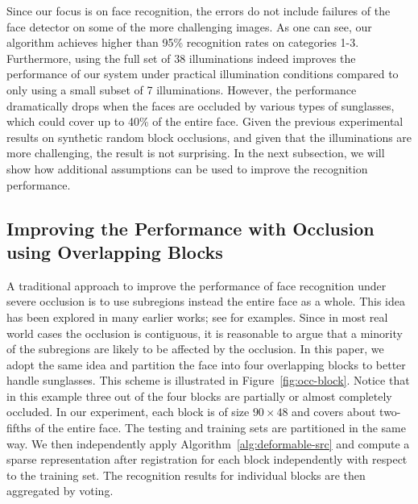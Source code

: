 \documentclass[12pt,journal,draftcls,letterpaper,onecolumn]{IEEEtran}
\begin{document}
Since our focus is on face
recognition, the errors do not include failures of the face
detector on some of the more challenging images.
As one can see, our algorithm achieves higher than 95\%
recognition rates on categories 1-3. Furthermore, using the
full set of 38 illuminations indeed improves the performance of
our system under practical illumination conditions compared to
only using a small subset of 7 illuminations. However, the
performance dramatically drops when the faces are occluded by
various types of sunglasses, which could cover up to 40\% of
the entire face. Given the previous experimental results on
synthetic random block occlusions, and given that the
illuminations are more challenging, the result is not
surprising. In the next subsection, we will show how additional
assumptions can be used to improve the recognition performance.

\subsection{Improving the Performance with Occlusion using Overlapping Blocks}
A traditional approach to improve the performance of face
recognition under severe occlusion is to use subregions instead
the entire face as a whole. This idea has been explored in many
earlier works; see \cite{Pentland1994-CVPR, Wright2009-PAMI}
for examples. Since in most real world cases the occlusion is contiguous, it is reasonable to argue that a minority of the
subregions are likely to be affected by the occlusion. In this
paper, we adopt the same idea and partition the face into four
overlapping blocks to better handle sunglasses. This
scheme is illustrated in Figure~\ref{fig:occ-block}. Notice
that in this example three out of the four blocks are partially
or almost completely occluded. In our experiment, each block is
of size $90\times 48$ and covers about two-fifths of the entire
face. The testing and training sets are partitioned in the same
way. We then independently apply
Algorithm~\ref{alg:deformable-src} and compute a sparse
representation after registration for each block independently
with respect to the training set. The recognition
results for individual blocks are then aggregated by voting.
\end{document}
